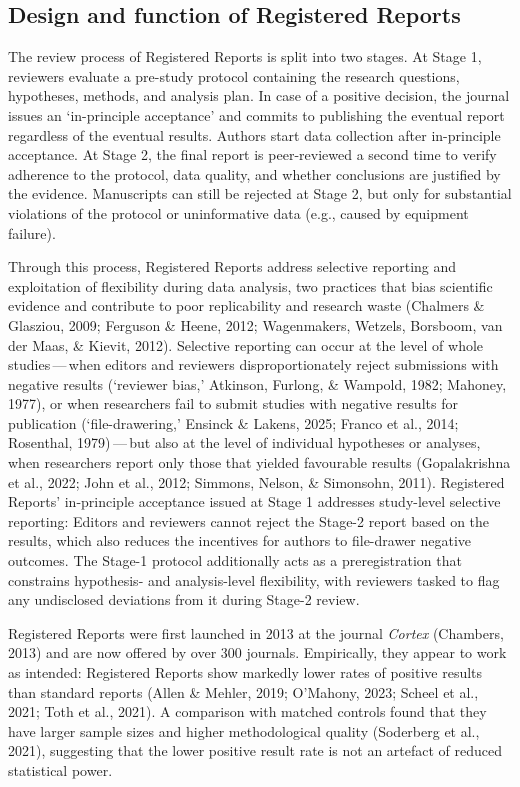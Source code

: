 \documentclass[
  british,
  a4paper,
  ,man,mask,floatsintext]{apa6}
\begin{document}
\subsection{Design and function of Registered Reports}\label{design-and-function-of-registered-reports}

The review process of Registered Reports is split into two stages.
At Stage 1, reviewers evaluate a pre-study protocol containing the research questions, hypotheses, methods, and analysis plan.
In case of a positive decision, the journal issues an `in-principle acceptance' and commits to publishing the eventual report regardless of the eventual results.
Authors start data collection after in-principle acceptance.
At Stage 2, the final report is peer-reviewed a second time to verify adherence to the protocol, data quality, and whether conclusions are justified by the evidence.
Manuscripts can still be rejected at Stage 2, but only for substantial violations of the protocol or uninformative data (e.g., caused by equipment failure).

Through this process, Registered Reports address selective reporting and exploitation of flexibility during data analysis, two practices that bias scientific evidence and contribute to poor replicability and research waste (Chalmers \& Glasziou, 2009; Ferguson \& Heene, 2012; Wagenmakers, Wetzels, Borsboom, van der Maas, \& Kievit, 2012).
Selective reporting can occur at the level of whole studies\(\,\)---\(\,\)when editors and reviewers disproportionately reject submissions with negative results (`reviewer bias,' Atkinson, Furlong, \& Wampold, 1982; Mahoney, 1977), or when researchers fail to submit studies with negative results for publication (`file-drawering,' Ensinck \& Lakens, 2025; Franco et al., 2014; Rosenthal, 1979)\(\,\)---\(\,\)but also at the level of individual hypotheses or analyses, when researchers report only those that yielded favourable results (Gopalakrishna et al., 2022; John et al., 2012; Simmons, Nelson, \& Simonsohn, 2011).
Registered Reports' in-principle acceptance issued at Stage 1 addresses study-level selective reporting:
Editors and reviewers cannot reject the Stage-2 report based on the results, which also reduces the incentives for authors to file-drawer negative outcomes.
The Stage-1 protocol additionally acts as a preregistration that constrains hypothesis- and analysis-level flexibility, with reviewers tasked to flag any undisclosed deviations from it during Stage-2 review.

Registered Reports were first launched in 2013 at the journal \emph{Cortex} (Chambers, 2013) and are now offered by over 300 journals.
Empirically, they appear to work as intended:
Registered Reports show markedly lower rates of positive results than standard reports (Allen \& Mehler, 2019; O'Mahony, 2023; Scheel et al., 2021; Toth et al., 2021).
A comparison with matched controls found that they have larger sample sizes and higher methodological quality (Soderberg et al., 2021), suggesting that the lower positive result rate is not an artefact of reduced statistical power.
\end{document}
